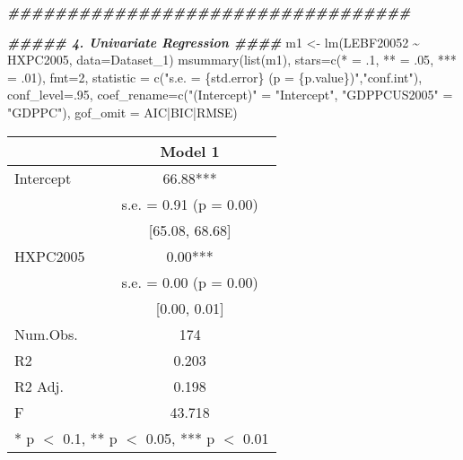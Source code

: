 \documentclass[
]{article}
\newenvironment{Shaded}{\begin{snugshade}}{\end{snugshade}}
\newcommand{\AttributeTok}[1]{\textcolor[rgb]{0.77,0.63,0.00}{#1}}
\newcommand{\DecValTok}[1]{\textcolor[rgb]{0.00,0.00,0.81}{#1}}
\newcommand{\DocumentationTok}[1]{\textcolor[rgb]{0.56,0.35,0.01}{\textbf{\textit{#1}}}}
\newcommand{\FunctionTok}[1]{\textcolor[rgb]{0.00,0.00,0.00}{#1}}
\newcommand{\NormalTok}[1]{#1}
\newcommand{\OtherTok}[1]{\textcolor[rgb]{0.56,0.35,0.01}{#1}}
\newcommand{\SpecialCharTok}[1]{\textcolor[rgb]{0.00,0.00,0.00}{#1}}
\newcommand{\StringTok}[1]{\textcolor[rgb]{0.31,0.60,0.02}{#1}}
\begin{document}
\begin{Shaded}
\begin{Highlighting}[]
\DocumentationTok{\#\#\#\#\#\#\#\#\#\#\#\#\#\#\#\#\#\#\#\#\#\#\#\#\#\#\#\#\#\#\#\#\#\#}


\DocumentationTok{\#\#\#\#\# 4. Univariate Regression \#\#\#\#}
\NormalTok{m1 }\OtherTok{\textless{}{-}} \FunctionTok{lm}\NormalTok{(LEBF20052 }\SpecialCharTok{\textasciitilde{}}\NormalTok{ HXPC2005, }\AttributeTok{data=}\NormalTok{Dataset\_1)}
\FunctionTok{msummary}\NormalTok{(}\FunctionTok{list}\NormalTok{(m1),}
         \AttributeTok{stars=}\FunctionTok{c}\NormalTok{(}\StringTok{\textquotesingle{}*\textquotesingle{}} \OtherTok{=}\NormalTok{ .}\DecValTok{1}\NormalTok{, }\StringTok{\textquotesingle{}**\textquotesingle{}} \OtherTok{=}\NormalTok{ .}\DecValTok{05}\NormalTok{, }\StringTok{\textquotesingle{}***\textquotesingle{}} \OtherTok{=}\NormalTok{ .}\DecValTok{01}\NormalTok{),}
         \AttributeTok{fmt=}\DecValTok{2}\NormalTok{,}
         \AttributeTok{statistic =} \FunctionTok{c}\NormalTok{(}\StringTok{"s.e. = \{std.error\} (p = \{p.value\})"}\NormalTok{,}\StringTok{"conf.int"}\NormalTok{),}
         \AttributeTok{conf\_level=}\NormalTok{.}\DecValTok{95}\NormalTok{,}
         \AttributeTok{coef\_rename=}\FunctionTok{c}\NormalTok{(}\StringTok{"(Intercept)"} \OtherTok{=} \StringTok{"Intercept"}\NormalTok{, }\StringTok{"GDPPCUS2005"} \OtherTok{=} \StringTok{"GDPPC"}\NormalTok{),}
         \AttributeTok{gof\_omit =} \StringTok{\textquotesingle{}AIC|BIC|RMSE\textquotesingle{}}\NormalTok{) }
\end{Highlighting}
\end{Shaded}

\begin{table}
\centering
\begin{tabular}[t]{lc}
\toprule
  & Model 1\\
\midrule
Intercept & \num{66.88}***\\
 & s.e. = \num{0.91} (p = \num{0.00})\\
 & {}[\num{65.08}, \num{68.68}]\\
HXPC2005 & \num{0.00}***\\
 & s.e. = \num{0.00} (p = \num{0.00})\\
 & {}[\num{0.00}, \num{0.01}]\\
\midrule
Num.Obs. & \num{174}\\
R2 & \num{0.203}\\
R2 Adj. & \num{0.198}\\
F & \num{43.718}\\
\bottomrule
\multicolumn{2}{l}{\rule{0pt}{1em}* p $<$ 0.1, ** p $<$ 0.05, *** p $<$ 0.01}\\
\end{tabular}
\end{table}
\end{document}
